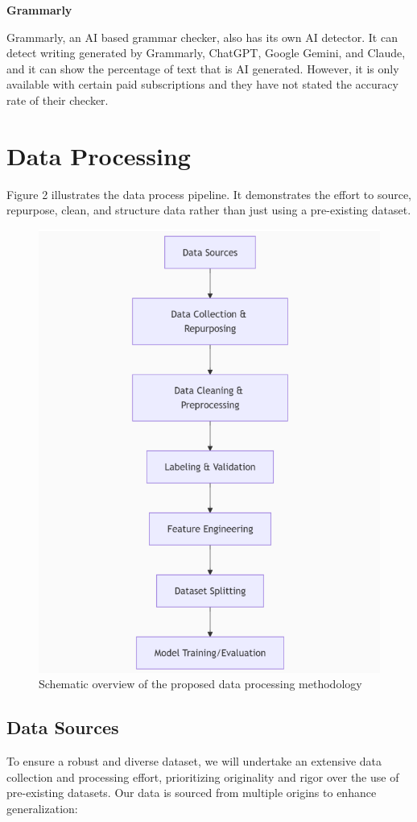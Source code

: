 \documentclass{article} %
\begin{document}
\textbf{Grammarly}

Grammarly, an AI based grammar checker, also has its own AI detector. It can detect writing generated by Grammarly, ChatGPT, Google Gemini, and Claude, and it can show the percentage of text that is AI generated. However, it is only available with certain paid subscriptions and they have not stated the accuracy rate of their checker.

\newpage
\section{Data Processing}
Figure 2 illustrates the data process pipeline. It demonstrates the effort to source, repurpose, clean, and structure data rather than just using a pre-existing dataset.

\begin{figure}[H]
    \centering
    \includegraphics[width=0.7\linewidth,height=0.4\textheight,keepaspectratio]{data.png}
    \caption{Schematic overview of the proposed data processing methodology}
    \label{fig:pipeline}
\end{figure}

\subsection{Data Sources}
To ensure a robust and diverse dataset, we will undertake an extensive data collection and processing effort, prioritizing originality and rigor over the use of pre-existing datasets. Our data is sourced from multiple origins to enhance generalization:
\end{document}
